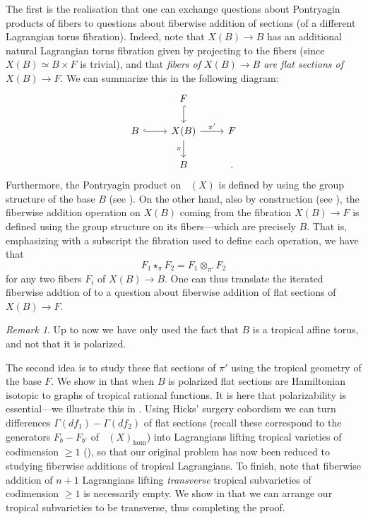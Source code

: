 \documentclass[10pt]{amsart}
\newcounter{mainthm}
\theoremstyle{definition}
\theoremstyle{remark}
\newtheorem{remark}[thm]{Remark}
\DeclareMathOperator{\Cobfib}{\mathrm{Cob}_{\mathrm{fib}}}
\def\x{\times}
\begin{document}
The first is the realisation that one can exchange questions about Pontryagin products of fibers to questions about fiberwise addition of sections (of a different Lagrangian torus fibration).
Indeed, note that $X(B) \to B$ has an additional natural Lagrangian torus fibration given by projecting to the fibers (since $X(B) \simeq B \x F$ is trivial), and that \emph{fibers of $X(B) \to B$ are flat sections of $X(B) \to F$}.
We can summarize this in the following diagram:
$$
\begin{tikzcd}
    & F \ar[d, hookrightarrow] &  \\
    B \ar[r, hookrightarrow] & X(B) \ar[d, "\pi"'] \ar[r, "\pi'"] & F \\
    & B & .
\end{tikzcd}
$$
Furthermore, the Pontryagin product on $\Cobfib(X)$ is defined by using the group structure of the base $B$ (see ). 
On the other hand, also by construction (see ), the fiberwise addition operation on $X(B)$ coming from the fibration $X(B) \to F$ is defined using the group structure on its fibers---which are precisely $B$.
That is, emphasizing with a subscript the fibration used to define each operation, we have that 
\begin{equation}\label{eq:pontryagin_vs_fiberwise}
    F_1 \star_{\pi} F_2 = F_1 \otimes_{\pi'} F_2
\end{equation}
for any two fibers $F_i$ of $X(B) \to B$.
One can thus translate the iterated fiberwise addtion of  to a question about fiberwise addition of flat sections of $X(B) \to F$.
\begin{remark}
    Up to now we have only used the fact that $B$ is a tropical affine torus, and not that it is polarized.
\end{remark}

The second idea is to study these flat sections of $\pi'$ using the tropical geometry of the base $F$.
We show in  that when $B$ is polarized flat sections are Hamiltonian isotopic to graphs of tropical rational functions. 
It is here that polarizability is essential---we illustrate this in .
Using Hicks' surgery cobordism \cite{hicks2020tropical} we can turn differences $\Gamma(df_1) - \Gamma(df_2)$ of flat sections (recall these correspond to the generators $F_b - F_{b'}$ of $\Cobfib(X)_{\hom}$) into Lagrangians lifting tropical varieties of codimension $\geq 1$ (), so that our original problem has now been reduced to studying fiberwise additions of tropical Lagrangians.
To finish, note that fiberwise addition of $n+1$ Lagrangians lifting \emph{transverse} tropical subvarieties of codimension $\geq 1$ is necessarily empty.
We show in  that we can arrange our tropical subvarieties to be transverse, thus completing the proof.
\end{document}
